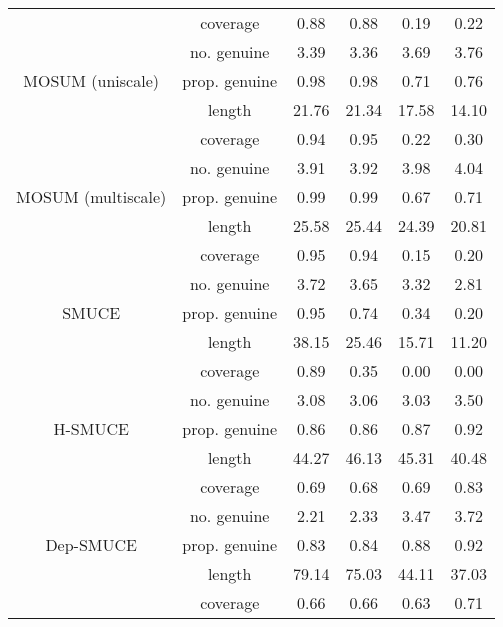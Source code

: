 \begin{tabular}{|c|c|c|c|c|c|}
   & coverage & 0.88 & 0.88 & 0.19 & 0.22 \\ 
   & no. genuine & 3.39 & 3.36 & 3.69 & 3.76 \\ 
  MOSUM (uniscale) & prop. genuine & 0.98 & 0.98 & 0.71 & 0.76 \\ 
   & length & 21.76 & 21.34 & 17.58 & 14.10 \\ 
   & coverage & 0.94 & 0.95 & 0.22 & 0.30 \\ 
   & no. genuine & 3.91 & 3.92 & 3.98 & 4.04 \\ 
  MOSUM (multiscale) & prop. genuine & 0.99 & 0.99 & 0.67 & 0.71 \\ 
   & length & 25.58 & 25.44 & 24.39 & 20.81 \\ 
   & coverage & 0.95 & 0.94 & 0.15 & 0.20 \\ 
   & no. genuine & 3.72 & 3.65 & 3.32 & 2.81 \\ 
  SMUCE & prop. genuine & 0.95 & 0.74 & 0.34 & 0.20 \\ 
   & length & 38.15 & 25.46 & 15.71 & 11.20 \\ 
   & coverage & 0.89 & 0.35 & 0.00 & 0.00 \\ 
   & no. genuine & 3.08 & 3.06 & 3.03 & 3.50 \\ 
  H-SMUCE & prop. genuine & 0.86 & 0.86 & 0.87 & 0.92 \\ 
   & length & 44.27 & 46.13 & 45.31 & 40.48 \\ 
   & coverage & 0.69 & 0.68 & 0.69 & 0.83 \\ 
   & no. genuine & 2.21 & 2.33 & 3.47 & 3.72 \\ 
  Dep-SMUCE & prop. genuine & 0.83 & 0.84 & 0.88 & 0.92 \\ 
   & length & 79.14 & 75.03 & 44.11 & 37.03 \\ 
   & coverage & 0.66 & 0.66 & 0.63 & 0.71 \\ 
   \hline
\end{tabular}
